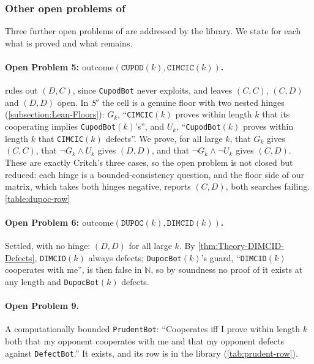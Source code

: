 \documentclass[twoside,11pt]{article}
\begin{document}
\subsubsection{Other open problems of \citet{Critch}}
\label{apx-subsubsection:Theory-AddResultsCritch-OpenProblems}
Three further open problems of \citet{Critch} are addressed by the library. We state for each what is proved and what remains.

\paragraph{Open Problem 5: $\mathrm{outcome}(\texttt{CUPOD}(k), \texttt{CIMCIC}(k))$.}
\citet{Critch} rules out $(D,C)$, since \texttt{CupodBot} never exploits, and leaves $(C,C)$, $(C,D)$ and $(D,D)$ open. In $S'$ the cell is a genuine floor with two nested hinges (\cref{subsection:Lean-Floors}): $G_k$, \enquote{\texttt{CIMCIC}$(k)$ proves within length $k$ that its cooperating implies \texttt{CupodBot}$(k)$'s}, and $U_k$, \enquote{\texttt{CupodBot}$(k)$ proves within length $k$ that \texttt{CIMCIC}$(k)$ defects}. We prove, for all large $k$, that $G_k$ gives $(C,C)$, that $\neg G_k \wedge U_k$ gives $(D,D)$, and that $\neg G_k \wedge \neg U_k$ gives $(C,D)$. These are exactly Critch's three cases, so the open problem is not closed but reduced: each hinge is a bounded-consistency question, and the floor side of our matrix, which takes both hinges negative, reports $(C,D)$, both searches failing.
\cref{table:dupoc-row}

\paragraph{Open Problem 6: $\mathrm{outcome}(\texttt{DUPOC}(k), \texttt{DIMCID}(k))$.}
Settled, with no hinge: $(D,D)$ for all large $k$. By \cref{thm:Theory-DIMCID-Defects}, \texttt{DIMCID}$(k)$ always defects; \texttt{DupocBot}$(k)$'s guard, \enquote{\texttt{DIMCID}$(k)$ cooperates with me}, is then false in $\mathbb{N}$, so by soundness no proof of it exists at any length and \texttt{DupocBot}$(k)$ defects.

\paragraph{Open Problem 9.} A computationally bounded \texttt{PrudentBot}: \enquote{Cooperates iff I prove within length $k$ both that my opponent cooperates with me and that my opponent defects against \texttt{DefectBot}.} It exists, and its row is in the library (\cref{tab:prudent-row}).
\end{document}
